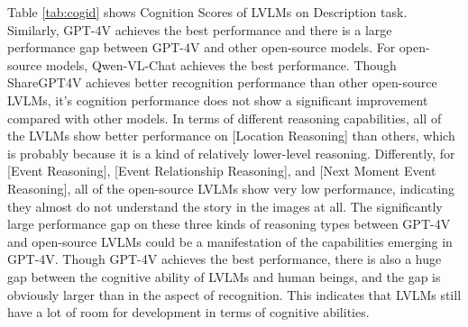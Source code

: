 Table \ref{tab:cogid} shows Cognition Scores of LVLMs on Description task. 
Similarly, GPT-4V achieves the best performance and there is a large performance gap between GPT-4V and other open-source models. 
For open-source models, Qwen-VL-Chat achieves the best performance.
Though ShareGPT4V achieves better recognition performance than other open-source LVLMs, it's cognition performance does not show a significant improvement compared with other models.
In terms of different reasoning capabilities, all of the LVLMs show better performance on [Location Reasoning] than others, which is probably because it is a kind of relatively lower-level reasoning.
Differently, for [Event Reasoning], [Event Relationship Reasoning], and [Next Moment Event Reasoning], all of the open-source LVLMs show very low performance, indicating they almost do not understand the story in the images at all.
The significantly large performance gap on these three kinds of reasoning types between GPT-4V and open-source LVLMs could be a manifestation of the capabilities emerging in GPT-4V.
Though GPT-4V achieves the best performance, there is also a huge gap between the cognitive ability of LVLMs and human beings, and the gap is obviously larger than in the aspect of recognition.
This indicates that LVLMs still have a lot of room for development in terms of cognitive abilities.





